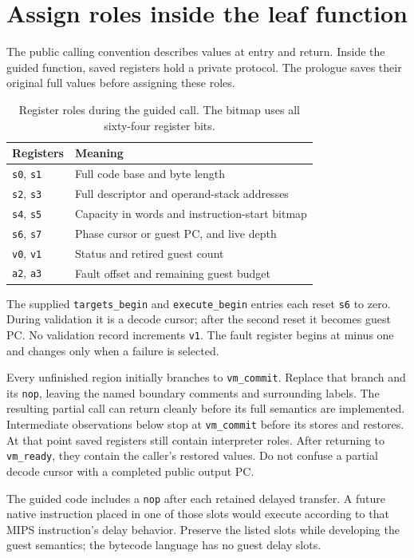 \section{Assign roles inside the leaf function}\label{vm-registers}
The public calling convention describes values at entry and return. Inside the guided
function, saved registers hold a private protocol. The prologue saves their original
full values before assigning these roles.

\begin{table}[htbp]
  \centering
  \caption{Register roles during the guided call. The bitmap uses all sixty-four register bits.}
  \begin{tabular}{ll}
    \toprule
    Registers                & Meaning                                        \\
    \midrule
    \texttt{s0}, \texttt{s1} & Full code base and byte length                 \\
    \texttt{s2}, \texttt{s3} & Full descriptor and operand-stack addresses    \\
    \texttt{s4}, \texttt{s5} & Capacity in words and instruction-start bitmap \\
    \texttt{s6}, \texttt{s7} & Phase cursor or guest PC, and live depth       \\
    \texttt{v0}, \texttt{v1} & Status and retired guest count                 \\
    \texttt{a2}, \texttt{a3} & Fault offset and remaining guest budget        \\
    \bottomrule
  \end{tabular}
\end{table}

The supplied \texttt{targets\_begin} and \texttt{execute\_begin} entries each reset
\texttt{s6} to zero. During validation it is a decode cursor; after the second reset
it becomes guest PC. No validation record increments \texttt{v1}. The fault register
begins at minus one and changes only when a failure is selected.

Every unfinished region initially branches to \texttt{vm\_commit}. Replace that
branch and its \texttt{nop}, leaving the named boundary comments and surrounding
labels. The resulting partial call can return cleanly before its full semantics are
implemented. Intermediate observations below stop at \texttt{vm\_commit} before its
stores and restores. At that point saved registers still contain interpreter roles.
After returning to \texttt{vm\_ready}, they contain the caller's restored values.
Do not confuse a partial decode cursor with a completed public output PC.

The guided code includes a \texttt{nop} after each retained delayed transfer. A
future native instruction placed in one of those slots would execute according to
that MIPS instruction's delay behavior. Preserve the listed slots while developing
the guest semantics; the bytecode language has no guest delay slots.
